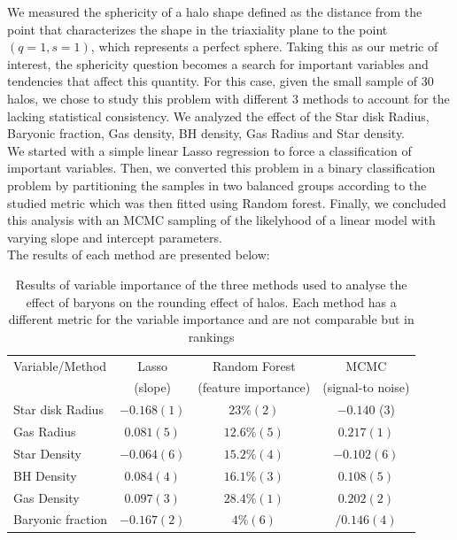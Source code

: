 \documentclass[a4paper,fleqn,usenatbib]{mnras}
\begin{document}
  We measured the sphericity of a halo shape defined as the distance 
  from the point that characterizes the shape in the triaxiality plane
  to the point $(q=1,s=1)$, which represents a perfect sphere. Taking this 
  as our metric of interest, the sphericity question becomes a search for
  important variables and tendencies that affect this quantity. For this case,
  given the small sample of 30 halos, we chose to study this problem with different 
  3 methods to account for the lacking statistical consistency. We analyzed the effect
  of the Star disk Radius, Baryonic fraction, Gas density, BH density, Gas Radius and
  Star density.\\
   
  We started with a simple linear Lasso regression to force a classification of 
  important variables. Then, we converted this problem in a binary classification problem
  by partitioning the samples in two balanced groups according to the studied metric which was then fitted using Random forest.
  Finally, we concluded this analysis with an MCMC sampling of the likelyhood of a linear model
  with varying slope and intercept parameters.\\
  
  The results of each method are presented below:
  
  \begin{table}
\setlength{\tabcolsep}{3pt}
\begin{center}
\begin{tabular}{l|ccc}
 Variable/Method& Lasso& Random Forest & MCMC \\
 & (slope) & (feature importance)&(signal-to noise)\\
\hline 
Star disk Radius &$-0.168 (1)$&$23\% (2)$&$-0.140$  (3)\\[0.1cm]
Gas Radius&$0.081 (5)$&$12.6\% (5)$&$0.217 (1)$\\[0.1cm] 
Star Density &$-0.064 (6)$&$15.2\% (4)$&$-0.102 (6)$\\[0.1cm]
BH Density&$0.084 (4)$&$16.1\% (3)$&$0.108 (5)$\\[0.1cm] 
Gas Density &$0.097 (3)$&$28.4 \%(1)$&$0.202 (2)$\\[0.1cm] 
Baryonic fraction &$-0.167 (2)$&$4\% (6)$&$/0.146 (4)$\\[0.1cm]  
\end{tabular}
\end{center}
\caption{Results of variable importance of the three methods used to analyse
		 the effect of baryons on the rounding effect of halos. Each method has a different
		 metric for the variable importance and are not comparable but in rankings}  
\label{table:sphericity}
\end{table} 
\end{document}
